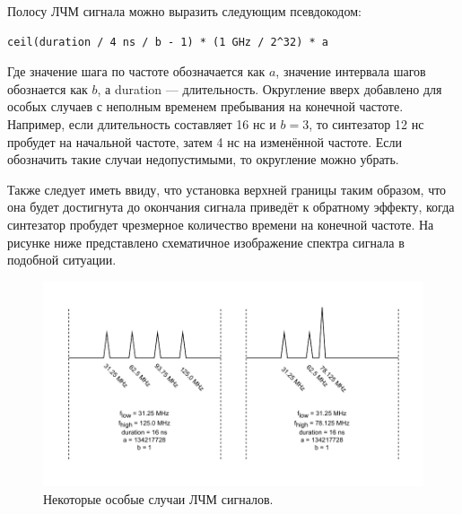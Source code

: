 \documentclass[rusmathsym, eqnumwithinsec, amspack, hyperref]{bomgost}
\begin{document}
Полосу ЛЧМ сигнала можно выразить следующим псевдокодом:

\lstset{
	language=c,
	basicstyle=\scriptsize\ttfamily,
	numbers=left,
	stepnumber=1,
	showstringspaces=false,
	tabsize=4,
	breaklines=true,
	breakatwhitespace=false,
	xleftmargin=.1\textwidth, xrightmargin=.1\textwidth,
	belowskip=1em, aboveskip=1em
}
\begin{lstlisting}
ceil(duration / 4 ns / b - 1) * (1 GHz / 2^32) * a
\end{lstlisting}

Где значение шага по частоте обозначается как $a$, значение интервала шагов обознается как $b$, а duration --- длительность. Округление вверх добавлено для особых случаев с неполным временем пребывания на конечной частоте. Например, если длительность составляет 16 нс и $b=3$, то синтезатор 12 нс пробудет на начальной частоте, затем 4 нс на изменённой частоте. Если обозначить такие случаи недопустимыми, то округление можно убрать.

Также следует иметь ввиду, что установка верхней границы таким образом, что она будет достигнута до окончания сигнала приведёт к обратному эффекту, когда синтезатор пробудет чрезмерное количество времени на конечной частоте. На рисунке ниже представлено схематичное изображение спектра сигнала в подобной ситуации.

%
%
\begin{gostfigure}
\begin{figure}[H]
\centering
\includegraphics{data/sweep_edge_cases.drawio.pdf}
\caption{Некоторые особые случаи ЛЧМ сигналов.}
\label{fig:sweep_edge_cases}
\end{figure}
\end{gostfigure}
\end{document}
